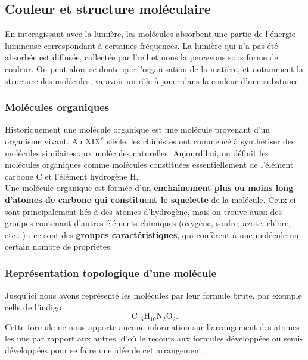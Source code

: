 \documentclass[11pt,a4paper]{report}
\begin{document}
\subsection{Couleur et structure moléculaire}

En interagissant avec la lumière, les molécules absorbent une partie de l'énergie lumineuse correspondant à certaines fréquences. La lumière qui n'a pas été absorbée est diffusée, collectée par l'œil et nous la percevons sous forme de couleur. On peut alors se doute que l'organisation de la matière, et notamment la structure des molécules, va avoir un rôle à jouer dans la couleur d'une substance.

\subsubsection{Molécules organiques}

Historiquement une molécule organique est une molécule provenant d'un organisme vivant. Au $\text{XIX}^e$ siècle, les chimistes ont commencé à synthétiser des molécules similaires aux molécules naturelles.
Aujourd'hui, on définit les molécules organiques comme molécules constituées essentiellement de l'élément carbone C et l'élément hydrogène H.\\

Une molécule organique est formée d'un \textbf{enchaînement plus ou moins long d'atomes de carbone
qui constituent le squelette} de la molécule. Ceux-ci sont principalement liés à des atomes
d'hydrogène, mais on trouve aussi des groupes contenant d'autres éléments chimiques (oxygène, soufre, azote, chlore, etc...) : ce sont des \textbf{groupes caractéristiques}, qui confèrent à une molécule un certain nombre de propriétés.

\subsubsection{Représentation topologique d'une molécule}

Jusqu'ici nous avons représenté les molécules par leur formule brute, par exemple celle de l'indigo
\begin{equation}
	\text{C}_{16}\text{H}_{10}\text{N}_2\text{O}_2.
\end{equation}
Cette formule ne nous apporte aucune information sur l'arrangement des atomes les uns par rapport aux autres, d'où le recours aux formules développées ou semi-développées pour se faire une idée de cet arrangement.\\
\end{document}
